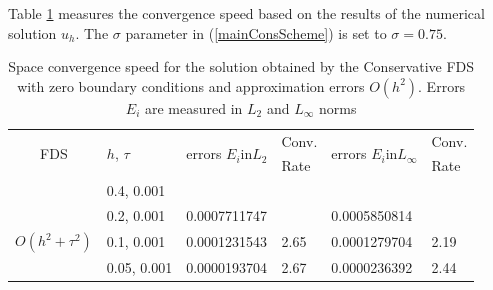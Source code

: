 \documentclass[%
 aip,
cp,  
 amsmath,amssymb,
 reprint,
]{iopconfser}
\newcommand{\rf}[1]{(\ref{#1})}
\begin{document}
Table \ref{tableC} measures the convergence speed based on the results of the numerical solution $u_h$. The $\sigma$ parameter in \rf{mainConsScheme} is set to $\sigma = 0.75$. 
\begin{table}[ht]
\centering
\small
		\begin{tabular}{||c|l|ll|ll||}
			\hline
			\hline
      \multirow{2  }{*}{FDS}        & \multirow{2  }{*}{$h$, $\tau$}  & \multirow{2  }{*}{errors $E_i$in$L_2$}  &Conv.& \multirow{2  }{*}{errors $E_i$in$L_\infty$}  &Conv.  \\
	                                        &                                                     &                                                                 &  Rate &                                                                       & Rate \\
   			\hline 
					\hline 
                                   &0.4, 0.001         &                    &                &                  &                   \\
                                   &0.2, 0.001         & 0.0007711747   &                & 0.0005850814  &                   \\
     $O(h^2 + \tau^ 2)$ &0.1, 0.001       & 0.0001231543  & 2.65       & 0.0001279704   &    2.19   \\
                                    &0.05, 0.001     & 0.0000193704    & 2.67     & 0.0000236392   &   2.44   \\
	   \hline
			\hline 
		\end{tabular}
		\caption{Space convergence speed for the solution obtained by the Conservative FDS with zero boundary conditions and approximation errors $O(h^{2})$. Errors $E_i$ are measured in $L_2$ and $L_\infty$ norms}
\label{tableC}
\end{table}
\end{document}

